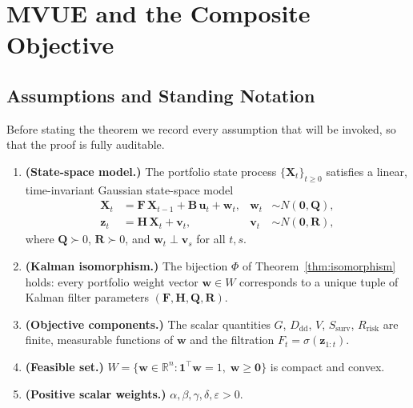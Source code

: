 \documentclass[12pt,openany]{book}
\numberwithin{equation}{chapter}
\theoremstyle{plain}
\theoremstyle{definition}
\theoremstyle{remark}
\def\mathcal#1{#1}%
\begin{document}
\section{MVUE and the Composite Objective}

\subsection*{Assumptions and Standing Notation}
\label{subsec:objective-assumptions}

Before stating the theorem we record every assumption that will be
invoked, so that the proof is fully auditable.

\begin{enumerate}
  \item[\textbf{A1.}] \textbf{(State-space model.)}
        The portfolio state process $\{\mathbf{X}_t\}_{t\ge 0}$
        satisfies a linear, time-invariant Gaussian state-space model
        \begin{align}
          \mathbf{X}_t &= \mathbf{F}\,\mathbf{X}_{t-1}
            + \mathbf{B}\,\mathbf{u}_t + \mathbf{w}_t,
          & \mathbf{w}_t &\sim \mathcal{N}(\mathbf{0},\mathbf{Q}),
          \label{eq:ssm-state}\\
          \mathbf{z}_t &= \mathbf{H}\,\mathbf{X}_t + \mathbf{v}_t,
          & \mathbf{v}_t &\sim \mathcal{N}(\mathbf{0},\mathbf{R}),
          \label{eq:ssm-obs}
        \end{align}
        where $\mathbf{Q}\succ 0$, $\mathbf{R}\succ 0$, and
        $\mathbf{w}_t \perp \mathbf{v}_s$ for all $t,s$.

  \item[\textbf{A2.}] \textbf{(Kalman isomorphism.)}
        The bijection $\Phi$ of Theorem~\ref{thm:isomorphism} holds:
        every portfolio weight vector $\mathbf{w}\in\mathcal{W}$
        corresponds to a unique tuple of Kalman filter parameters
        $(\mathbf{F},\mathbf{H},\mathbf{Q},\mathbf{R})$.

  \item[\textbf{A3.}] \textbf{(Objective components.)}
        The scalar quantities $G$, $D_{\mathrm{dd}}$, $V$,
        $S_{\mathrm{surv}}$, $R_{\mathrm{risk}}$ are finite,
        measurable functions of $\mathbf{w}$ and the filtration
        $\mathcal{F}_t = \sigma(\mathbf{z}_{1:t})$.

  \item[\textbf{A4.}] \textbf{(Feasible set.)}
        $\mathcal{W} = \{\mathbf{w}\in\mathbb{R}^n :
        \mathbf{1}^\top\mathbf{w}=1,\;\mathbf{w}\ge\mathbf{0}\}$
        is compact and convex.

  \item[\textbf{A5.}] \textbf{(Positive scalar weights.)}
        $\alpha,\beta,\gamma,\delta,\varepsilon > 0$.
\end{enumerate}
\end{document}
